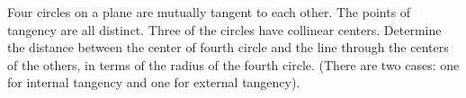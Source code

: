 Four circles on a plane are mutually tangent to each other.
The points of tangency are all distinct.
Three of the circles have collinear centers.
Determine the distance between the center of fourth circle
and the line through the centers of the others,
in terms of the radius of the fourth circle.\newline
(There are two cases: one for internal tangency and one for external tangency).
